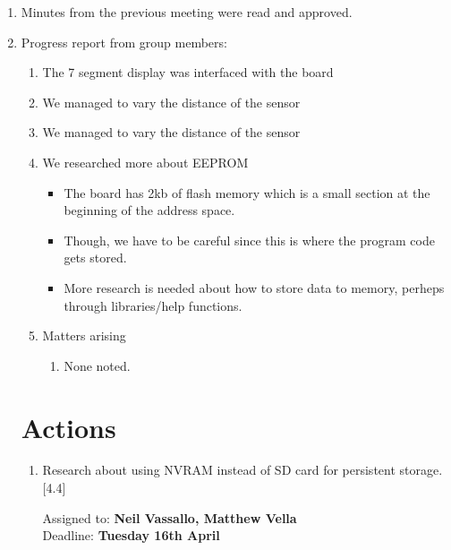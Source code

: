 \documentclass[11pt,a4paper]{article}
\begin{document}
\begin{enumerate}


\item Minutes from the previous meeting were read and approved.

\item Progress report from group members:
   \begin{enumerate}
   \item The 7 segment display was interfaced with the board

   \item We managed to vary the distance of the sensor

   \item We managed to vary the distance of the sensor
	
   \item We researched more about EEPROM
	\begin{itemize}
		\item The board has 2kb of flash memory which is a small section at the beginning of the address space.
		\item Though, we have to be careful since this is where the program code gets stored. 
		\item More research is needed about how to store data to memory, perheps through libraries/help functions. 
	\end{itemize}

    \item Matters arising
	\begin{enumerate}
		\item None noted. 
	\end{enumerate}

\end{enumerate}

\section*{Actions}

\begin{enumerate}

\item Research about using NVRAM instead of SD card for persistent storage.[4.4]
\begin{flushright}
	Assigned to: \textbf{Neil Vassallo, Matthew Vella} \\
	Deadline: \textbf{Tuesday 16th April}
\end{flushright}


\end{enumerate}
\end{enumerate}
\end{document}
